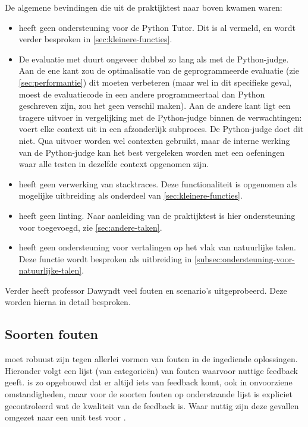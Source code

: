 De algemene bevindingen die uit de praktijktest naar boven kwamen waren:

\begin{itemize}
    \item \tested{} heeft geen ondersteuning voor de Python Tutor.
    Dit is al vermeld, en wordt verder besproken in \cref{sec:kleinere-functies}.
    \item De evaluatie met \tested{} duurt ongeveer dubbel zo lang als met de Python-judge.
    Aan de ene kant zou de optimalisatie van de geprogrammeerde evaluatie (zie \cref{sec:performantie}) dit moeten verbeteren (maar wel in dit specifieke geval, moest de evaluatiecode in een andere programmeertaal dan Python geschreven zijn, zou het geen verschil maken).
    Aan de andere kant ligt een tragere uitvoer in vergelijking met de Python-judge binnen de verwachtingen: \tested{} voert elke context uit in een afzonderlijk subproces.
    De Python-judge doet dit niet.
    Qua uitvoer worden wel contexten gebruikt, maar de interne werking van de Python-judge kan het best vergeleken worden met een oefeningen waar alle testen in dezelfde context opgenomen zijn.
    \item \tested{} heeft geen verwerking van stacktraces.
    Deze functionaliteit is opgenomen als mogelijke uitbreiding als onderdeel van \cref{sec:kleinere-functies}.
    \item \tested{} heeft geen linting.
    Naar aanleiding van de praktijktest is hier ondersteuning voor toegevoegd, zie \cref{sec:andere-taken}.
    \item \tested{} heeft geen ondersteuning voor vertalingen op het vlak van natuurlijke talen.
    Deze functie wordt besproken als uitbreiding in \cref{subsec:ondersteuning-voor-natuurlijke-talen}.
\end{itemize}

Verder heeft professor Dawyndt veel fouten en scenario's uitgeprobeerd.
Deze worden hierna in detail besproken.

\subsection{Soorten fouten}\label{subsec:soorten-fouten}

\tested{} moet robuust zijn tegen allerlei vormen van fouten in de ingediende oplossingen.
Hieronder volgt een lijst (van categorieën) van fouten waarvoor \tested{} nuttige feedback geeft.
\tested{} is zo opgebouwd dat er altijd iets van feedback komt, ook in onvoorziene omstandigheden, maar voor de soorten fouten op onderstaande lijst is expliciet gecontroleerd wat de kwaliteit van de feedback is.
Waar nuttig zijn deze gevallen omgezet naar een unit test voor \tested{}.

